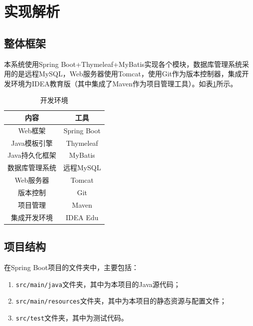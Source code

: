 \documentclass{nwafucoursepaper}
\begin{document}
\section{实现解析}

\subsection{整体框架}

本系统使用Spring Boot+Thymeleaf+MyBatis实现各个模块，数据库管理系统采用的是远程MySQL，Web服务器使用Tomcat，使用Git作为版本控制器，集成开发环境为IDEA教育版（其中集成了Maven作为项目管理工具）。如表\ref{environment}所示。

\begin{table}[htp]
  \centering
  \begin{tabular}{|c|c|}
  \hline
  内容        & 工具          \\ \hline
  Web框架     & Spring Boot \\ \hline
  Java模板引擎  & Thymeleaf   \\ \hline
  Java持久化框架 & MyBatis     \\ \hline
  数据库管理系统   & 远程MySQL     \\ \hline
  Web服务器     & Tomcat     \\ \hline
  版本控制      & Git         \\ \hline
  项目管理      & Maven       \\ \hline
  集成开发环境    & IDEA Edu    \\ \hline
  \end{tabular}
  \caption{开发环境}
  \label{environment}
\end{table}

\subsection{项目结构}

在Spring Boot项目的文件夹中，主要包括：
\begin{enumerate}
  \item \verb|src/main/java|文件夹，其中为本项目的Java源代码；
  \item \verb|src/main/resources|文件夹，其中为本项目的静态资源与配置文件；
  \item \verb|src/test|文件夹，其中为测试代码。
\end{enumerate}
\end{document}
